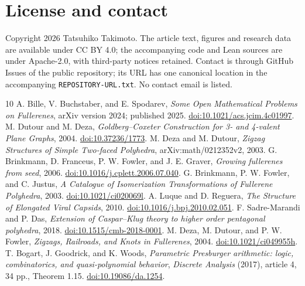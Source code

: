 \documentclass[11pt]{amsart}
\newcommand{\record}[1]{\nolinkurl{#1}}
\begin{document}
\section*{License and contact}
Copyright 2026 Tatsuhiko Takimoto. The article text, figures and research
data are available under CC BY 4.0; the accompanying code and Lean
sources are under Apache-2.0, with third-party notices retained.
Contact is through GitHub Issues of the public repository; its URL
has one canonical location in the accompanying
\record{REPOSITORY-URL.txt}. No contact email is listed.

\clearpage
\begin{thebibliography}{10}
 A. Bille, V. Buchstaber, and E. Spodarev,
\emph{Some Open Mathematical Problems on Fullerenes}, arXiv version
2024; published 2025. \href{https://doi.org/10.1021/acs.jcim.4c01997}{doi:10.1021/acs.jcim.4c01997}.
 M. Dutour and M. Deza,
\emph{Goldberg--Coxeter Construction for 3- and 4-valent Plane Graphs},
2004. \href{https://doi.org/10.37236/1773}{doi:10.37236/1773}.
 M. Deza and M. Dutour,
\emph{Zigzag Structures of Simple Two-faced Polyhedra},
arXiv:math/0212352v2, 2003.
 G. Brinkmann, D. Franceus, P. W. Fowler, and J. E. Graver,
\emph{Growing fullerenes from seed}, 2006.
\href{https://doi.org/10.1016/j.cplett.2006.07.040}{doi:10.1016/j.cplett.2006.07.040}.
 G. Brinkmann, P. W. Fowler, and C. Justus,
\emph{A Catalogue of Isomerization Transformations of Fullerene Polyhedra},
2003. \href{https://doi.org/10.1021/ci020069l}{doi:10.1021/ci020069l}.
 A. Luque and D. Reguera,
\emph{The Structure of Elongated Viral Capsids}, 2010.
\href{https://doi.org/10.1016/j.bpj.2010.02.051}{doi:10.1016/j.bpj.2010.02.051}.
 F. Sadre-Marandi and P. Das,
\emph{Extension of Caspar--Klug theory to higher order pentagonal polyhedra},
2018. \href{https://doi.org/10.1515/cmb-2018-0001}{doi:10.1515/cmb-2018-0001}.
 M. Deza, M. Dutour, and P. W. Fowler,
\emph{Zigzags, Railroads, and Knots in Fullerenes}, 2004.
\href{https://doi.org/10.1021/ci049955h}{doi:10.1021/ci049955h}.
 T. Bogart, J. Goodrick, and K. Woods,
\emph{Parametric Presburger arithmetic: logic, combinatorics, and
quasi-polynomial behavior}, \emph{Discrete Analysis} (2017),
article 4, 34 pp., Theorem 1.15.
\href{https://doi.org/10.19086/da.1254}{doi:10.19086/da.1254}.
\end{thebibliography}
\end{document}
